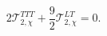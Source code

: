 \begin{equation}
2\mathcal{T}_{2,\chi }^{TTT}+\frac{9}{2}\mathcal{T}_{2,\chi }^{LT}=0.
\end{equation}%
